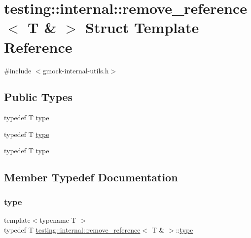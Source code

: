 \hypertarget{structtesting_1_1internal_1_1remove__reference_3_01_t_01_6_01_4}{}\section{testing\+::internal\+::remove\+\_\+reference$<$ T \& $>$ Struct Template Reference}
\label{structtesting_1_1internal_1_1remove__reference_3_01_t_01_6_01_4}


{\ttfamily \#include $<$gmock-\/internal-\/utils.\+h$>$}

\subsection*{Public Types}
\begin{DoxyCompactItemize}
\item 
typedef T \mbox{\hyperlink{structtesting_1_1internal_1_1remove__reference_3_01_t_01_6_01_4_a0d72f004f54016a47c752a82be352a19}{type}}
\item 
typedef T \mbox{\hyperlink{structtesting_1_1internal_1_1remove__reference_3_01_t_01_6_01_4_a0d72f004f54016a47c752a82be352a19}{type}}
\item 
typedef T \mbox{\hyperlink{structtesting_1_1internal_1_1remove__reference_3_01_t_01_6_01_4_a0d72f004f54016a47c752a82be352a19}{type}}
\end{DoxyCompactItemize}


\subsection{Member Typedef Documentation}
\mbox{\label{structtesting_1_1internal_1_1remove__reference_3_01_t_01_6_01_4_a0d72f004f54016a47c752a82be352a19}} 
\subsubsection{\texorpdfstring{type}{type}\hspace{0.1cm}{\footnotesize\ttfamily [1/3]}}
{\footnotesize\ttfamily template$<$typename T $>$ \\
typedef T \mbox{\hyperlink{structtesting_1_1internal_1_1remove__reference}{testing\+::internal\+::remove\+\_\+reference}}$<$ T \& $>$\+::\mbox{\hyperlink{structtesting_1_1internal_1_1remove__reference_3_01_t_01_6_01_4_a0d72f004f54016a47c752a82be352a19}{type}}}

